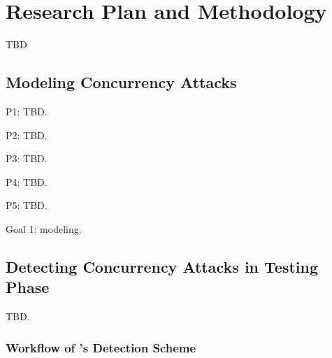\section{Research Plan and Methodology} \label{sec:rep}

TBD

\subsection{Modeling Concurrency Attacks} \label{sec:model}

P1: TBD.

P2: TBD.

P3: TBD.

P4: TBD.

P5: TBD.


Goal 1: modeling.

\subsection{Detecting Concurrency Attacks in Testing Phase}\label{sec:detect}

TBD.

\subsubsection{Workflow of \xxx's Detection Scheme}\label{sec:detect-arch}



